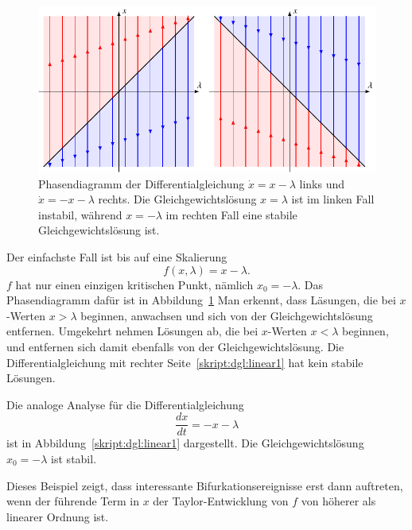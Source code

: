 \begin{beispiel}
\begin{figure}
\centering
\includegraphics{chapters/3/lin1.pdf}
\caption{
Phasendiagramm der Differentialgleichung $\dot x = x-\lambda$ links und
$\dot x = -x-\lambda$ rechts.
Die Gleichgewichtslösung $x=\lambda$ ist im linken Fall instabil,
während $x=-\lambda$ im rechten Fall eine stabile Gleichgewichtslösung ist.
\label{skript:dgl:phasen1}
}
\end{figure}%
Der einfachste Fall ist bis auf eine Skalierung
\begin{equation}
f(x,\lambda)=x-\lambda.
\label{skript:dgl:linear1}
\end{equation}
$f$ hat nur einen einzigen kritischen Punkt, nämlich $x_0=-\lambda$.
Das Phasendiagramm dafür ist in Abbildung~\ref{skript:dgl:phasen1}
Man erkennt, dass Läsungen, die bei $x$-Werten $x>\lambda$ beginnen,
anwachsen und sich von der Gleichgewichtslösung entfernen.
Umgekehrt nehmen Lösungen ab, die bei $x$-Werten $x<\lambda$ beginnen,
und entfernen sich damit ebenfalls von der Gleichgewichtslösung.
Die Differentialgleichung mit rechter Seite~\ref{skript:dgl:linear1}
hat kein stabile Lösungen.

Die analoge Analyse für die Differentialgleichung
\[
\frac{dx}{dt} = -x-\lambda
\]
ist in Abbildung~\ref{skript:dgl:linear1} dargestellt.
Die Gleichgewichtslösung $x_0=-\lambda$ ist stabil.
\end{beispiel}

Dieses Beispiel zeigt, dass interessante Bifurkationsereignisse
erst dann auftreten, wenn der führende Term in $x$ der Taylor-Entwicklung
von $f$ von höherer als linearer Ordnung ist.


